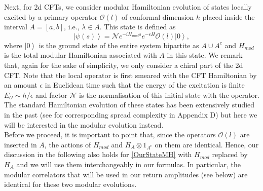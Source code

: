 \documentclass[aps,prl,twocolumn,showpacs,preprintnumbers,amsmath,amssymb]{revtex4-1}
\def\l{{\lambda}}
\def\be{\begin{equation}}
\def\ee{\end{equation}}
\newcommand{\ket}[1]{\left| #1 \right>}
\begin{document}
Next, for 2d CFTs, we consider modular Hamiltonian evolution of states locally excited by a primary operator $\mathcal{O}(l)$ of conformal dimension $h$ placed inside the interval $A=[a,b]$, i.e., $\l\in A$. This state is defined as
\be
\ket{\psi(s)}=\mathcal{N}e^{-iH_{mod} s}e^{-\epsilon H}\mathcal{O}(l)\ket{0},\label{OurStateMH}
\ee
where $\ket{0}$ is the ground state of the entire system bipartite as $A\cup A^c$ and $H_{mod}$ is the total modular Hamiltonian associated with $A$ in this state. We remark that, again for the sake of simplicity, we only consider a chiral part of the 2d CFT.
Note that the local operator is first smeared with the CFT Hamiltonian by an amount $\epsilon$ in Euclidean time such that the energy of the excitation is finite $E_\mathcal{O}\sim h/\epsilon$ and factor $\mathcal{N}$ is the normalisation of this initial state with the operator. The standard Hamiltonian evolution of these states has been extensively studied in the past \cite{Nozaki:2014hna,He:2014mwa,Caputa:2014vaa,Caputa:2014eta} (see for corresponding spread complexity in Appendix D) but here we will be interested in the modular evolution instead. \\
Before we proceed, it is important to point that, since the operators $\mathcal{O}(l)$ are inserted in $A$, the actions of $H_{mod}$ and $H_A\otimes 1_{A^c}$ on them are identical. Hence, our discussion in the following also holds for \eqref{OurStateMH} with $H_{mod}$ replaced by $H_{A}$ and we will use them interchangeably in our formulas. In particular, the modular correlators that will be used in our return amplitudes (see below) are identical for these two modular evolutions.
\end{document}
